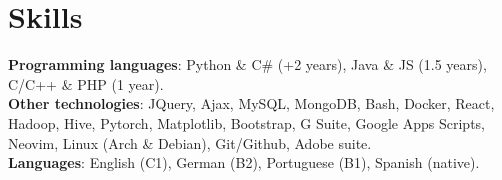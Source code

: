 \documentclass[letterpaper,11pt]{article}
\begin{document}
%
\section{Skills}
 \begin{itemize}[leftmargin=0.15in, label={}]
    \small{\item{
     \textbf{Programming languages}{: Python \& C\# (+2 years), Java \& JS (1.5 years), C/C++ \& PHP (1 year).} \\
     \textbf{Other technologies}{: JQuery, Ajax, MySQL, MongoDB, Bash, Docker, React, Hadoop, Hive, Pytorch,
     Matplotlib, Bootstrap, G Suite, Google Apps Scripts, Neovim, Linux (Arch \& Debian), Git/Github, Adobe suite.} \\
     \textbf{Languages}{: English (C1), German (B2), Portuguese (B1), Spanish (native).}
    }}
 \end{itemize}


\end{document}
